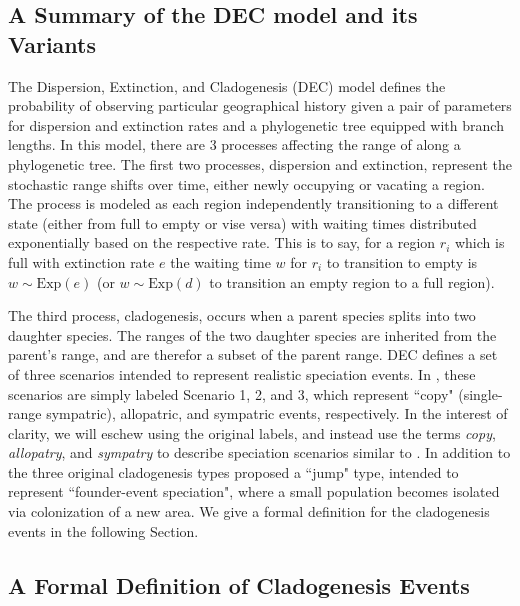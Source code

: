 \documentclass[a4paper]{article}
\begin{document}
\subsection{A Summary of the DEC model and its Variants} \label{sec:model}

The Dispersion, Extinction, and Cladogenesis (DEC) model defines the probability of observing particular geographical
history given a pair of parameters for dispersion and extinction rates and a phylogenetic tree equipped with branch
lengths. 
In this model, there are 3 processes affecting the range of along a phylogenetic tree.
The first two processes, dispersion and extinction, represent the stochastic range shifts over time, either newly
occupying or vacating a region.
The process is modeled as each region independently transitioning to a different state (either from full to empty or
vise versa) with waiting times distributed exponentially based on the respective rate.
This is to say, for a region \( r_i \) which is full with extinction rate \( e \) the waiting time \( w \) for \( r_i \)
to transition to empty is \( w \sim \text{Exp}(e) \) (or $w \sim \text{Exp}(d)$ to transition an empty region to a full
region).

The third process, cladogenesis, occurs when a parent species splits into two daughter species.
The ranges of the two daughter species are inherited from the parent's range, and are therefor a subset of the parent
range.
DEC defines a set of three scenarios intended to represent realistic speciation events.
In \citet{ALikelihoodFrReeR2005}, these scenarios are simply labeled Scenario 1, 2, and 3, which represent ``copy"
(single-range sympatric), allopatric, and sympatric events, respectively.
In the interest of clarity, we will eschew using the original labels, and instead use the terms \textit{copy},
\textit{allopatry}, and \textit{sympatry} to describe speciation scenarios similar to \citet{ModelSelectionMatzke2014}.
In addition to the three original cladogenesis types \citet{ModelSelectionMatzke2014} proposed a ``jump" type, intended
to represent ``founder-event speciation", where a small population becomes isolated via colonization of a new area.
We give a formal definition for the cladogenesis events in the following Section.

\subsection{A Formal Definition of Cladogenesis Events}
\label{sec:formal-cladogenesis}
\end{document}
